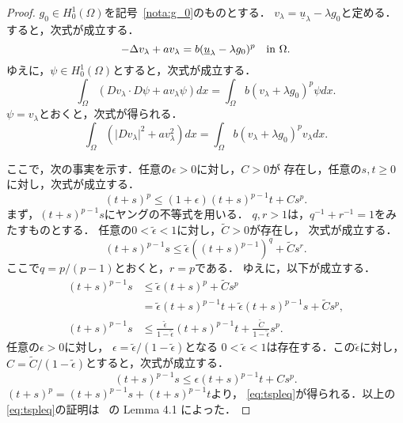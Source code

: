 \begin{proof}
 $g_0 \in H_0^1(\Omega)$を記号~\ref{nota:g_0}のものとする．
 $v_\lambda = \underline{u}_\lambda - \lambda g_0$と定める．
 すると，次式が成立する．
 \[
  -\Delta v_\lambda + a v_\lambda 
 = b(\underline{u}_\lambda - \lambda g_0)^p \ \ ~\text{in}~ \Omega.
 \]
 ゆえに，$\psi \in H_0^1(\Omega)$とすると，次式が成立する．
 \[
  \int_\Omega (Dv_\lambda \cdot D\psi + a v_\lambda \psi) dx =
 \int_\Omega b(v_\lambda + \lambda g_0)^p \psi dx.
 \]
 $\psi = v_\lambda$とおくと，次式が得られる．
 \begin{equation}
  \int_\Omega \left( \lvert Dv_\lambda \rvert^2 + a v_\lambda
               ^2 \right) dx =
  \int_\Omega b(v_\lambda + \lambda g_0)^p v_\lambda dx. \label{eq:v_lambda}
 \end{equation}

 ここで，次の事実を示す．任意の$\epsilon > 0$に対し，$C > 0$が
 存在し，任意の$s, t \geq 0$に対し，次式が成立する．
 \begin{equation}
  (t+s)^p \leq (1 + \epsilon) (t+s)^{p-1} t + C s^p. \label{eq:tspleq}
 \end{equation}
 まず，$(t+s)^{p-1}s$にヤングの不等式を用いる．
 $q, r > 1$は，$q^{-1} + r^{-1} = 1$をみたすものとする．
 任意の$0 < \tilde{\epsilon} < 1$に対し，$\tilde{C} > 0$が存在し，
 次式が成立する．
 \[
  (t+s)^{p-1} s \leq \tilde{\epsilon} \left( (t+s)^{p-1} \right)^q +
 \tilde{C} s^r.
 \]
 ここで$q = p/(p-1)$とおくと，$r = p$である．
 ゆえに，以下が成立する．
 \begin{align*}
  (t+s)^{p-1} s & \leq \tilde{\epsilon} (t+s)^p + \tilde{C} s^p \\
  &= \tilde{\epsilon} (t+s)^{p-1} t + \tilde{\epsilon} (t+s)^{p-1} s 
  + \tilde{C} s^p, \\
  (t+s)^{p-1} s &\leq \frac{\tilde{\epsilon}}{1 - \tilde{\epsilon}}
  (t+s)^{p-1} t + \frac{\tilde{C}}{1 - \tilde{\epsilon}} s^p.
 \end{align*}
 任意の$\epsilon > 0$に対し，
 $\epsilon = \tilde{\epsilon} / (1 - \tilde{\epsilon})$となる
 $0 < \tilde{\epsilon} < 1$は存在する．この$\tilde{\epsilon}$に対し，
 $C = \tilde{C}/ (1 - \tilde{\epsilon})$とすると，次式が成立する．
 \[
  (t+s)^{p-1} s \leq \epsilon (t+s)^{p-1} t + Cs^p.
 \]
 $(t+s)^{p} = (t+s)^{p-1} s + (t+s)^{p-1}t$より，
 \eqref{eq:tspleq}が得られる．以上の\eqref{eq:tspleq}の証明は
 \cite{MR2317491}~の Lemma 4.1 によった．


\end{proof}
